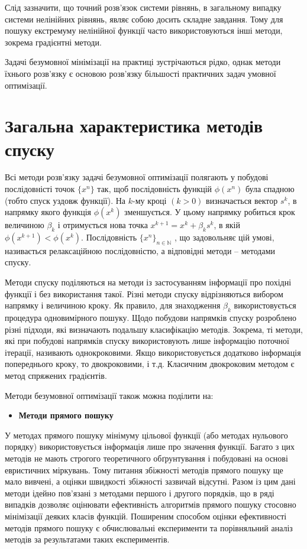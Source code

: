 Слід зазначити, що точний розв’язок системи рівнянь, в загальному випадку системи нелінійних рівнянь, являє собою досить складне завдання. Тому для пошуку екстремуму нелінійної функції часто використовуються інші методи, зокрема градієнтні методи.

Задачі безумовної мінімізації на практиці зустрічаються рідко, однак методи їхнього розв’язку є основою розв’язку більшості практичних задач умовної оптимізації.

\section {Загальна характеристика методів спуску}

Всі методи розв'язку задачі безумовної оптимізації полягають у побудові послідовністі точок $\{x^n\}$ так, щоб послідовність функцій $\phi(x^n)$ була спадною (тобто спуск уздовж функції). На $k$-му кроці $(k > 0)$ визначається вектор $s^k$, в напрямку якого функція $\phi(x^k)$ зменшується. У цьому напрямку робиться крок величиною $\beta_k$ і отримується нова точка
$x^{k+1} = x^k + \beta_ks^k$, в якій $\phi(x^{k+1}) < \phi(x^k)$. Послідовність $\{x^n\}_{n \in \mathbb{N}}$ , що задовольняє цій умові, називається релаксаційною послідовністю, а відповідні методи – методами спуску.

 Методи спуску поділяються на методи із застосуванням інформації про похідні функції і без використання такої. Різні методи спуску відрізняються вибором напрямку і величиною кроку. Як правило, для знаходження $\beta_k$ використовується процедура одновимірного пошуку. Щодо побудови напрямків спуску розроблено різні підходи, які визначають подальшу класифікацію методів. Зокрема, ті методи, які при побудові напрямків спуску використовують лише інформацію поточної ітерації, називають однокроковими. Якщо використовується додатково інформація попереднього кроку, то двокроковими, і т.д. Класичним двокроковим методом є метод спряжених градієнтів.

Методи безумовної оптимізації також можна поділити на:
\begin{itemize}
	\item \textbf{Методи прямого пошуку}
\end{itemize}

	У методах прямого пошуку мінімуму цільової функції (або методах нульового порядку) використовується інформація лише про значення функції. Багато з цих методів не мають строгого теоретичного обґрунтування і побудовані на основі евристичних міркувань. Тому питання збіжності методів прямого пошуку ще мало вивчені, а оцінки швидкості збіжності зазвичай відсутні. Разом із цим дані методи ідейно пов'язані з методами першого і другого порядків, що в ряді випадків дозволяє оцінювати ефективність алгоритмів прямого пошуку стосовно мінімізації деяких класів функцій. Поширеним способом оцінки ефективності методів прямого пошуку є обчислювальні експерименти та порівняльний аналіз методів за результатами таких експериментів.
	
